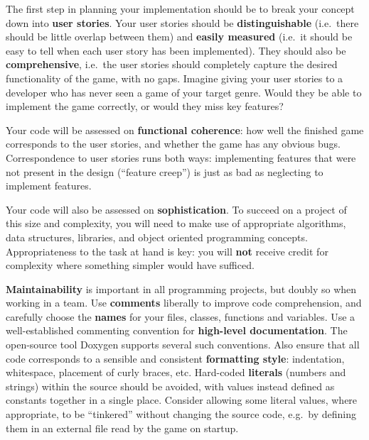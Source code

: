 \documentclass{../../fal_assignment}
\begin{document}
The first step in planning your implementation should be to break your concept down into \textbf{user stories}. 
Your user stories should be \textbf{distinguishable} (i.e.\ there should be little overlap between them)
and \textbf{easily measured} (i.e.\ it should be easy to tell when each user story has been implemented).
They should also be \textbf{comprehensive}, i.e.\ the user stories should completely capture the
desired functionality of the game, with no gaps.
Imagine giving your user stories to a developer who has never seen a game of your target genre.
Would they be able to implement the game correctly, or would they miss key features?


Your code will be assessed on \textbf{functional coherence}:
how well the finished game corresponds to the user stories,
and whether the game has any obvious bugs.
Correspondence to user stories runs both ways:
implementing features that were not present in the design (``feature creep'')
is just as bad as neglecting to implement features.

Your code will also be assessed on \textbf{sophistication}.
To succeed on a project of this size and complexity,
you will need to make use of appropriate algorithms, data structures, libraries, and object oriented programming concepts.
Appropriateness to the task at hand is key:
you will \textbf{not} receive credit for complexity  
where something simpler would have sufficed.

\textbf{Maintainability} is important in all programming projects,
but doubly so when working in a team.
Use \textbf{comments} liberally to improve code comprehension,
and carefully choose the \textbf{names} for your files, classes, functions and variables.
Use a well-established commenting convention
for \textbf{high-level documentation}.
The open-source tool Doxygen supports several such conventions.
Also ensure that all code corresponds to a sensible and consistent \textbf{formatting style}:
indentation, whitespace, placement of curly braces, etc.
Hard-coded \textbf{literals} (numbers and strings) within the source should be avoided,
with values instead defined as constants together in a single place.
Consider allowing some literal values, where appropriate, to be ``tinkered'' without changing the source code,
e.g.\ by defining them in an external file read by the game on startup.
\end{document}

